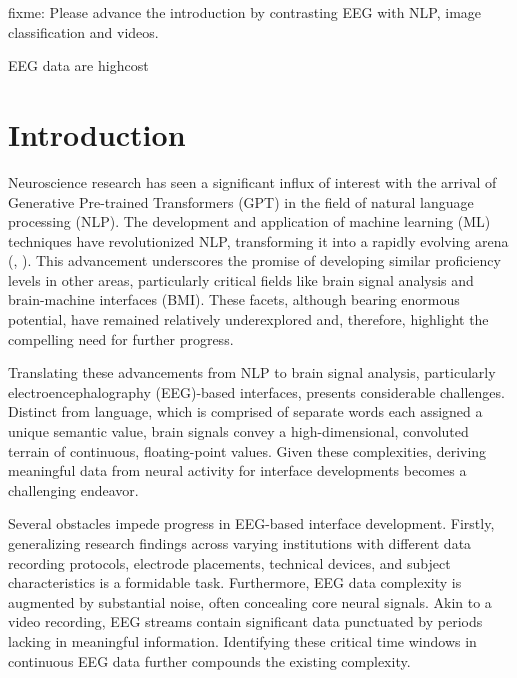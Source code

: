 fixme:
Please advance the introduction by contrasting EEG with NLP, image classification and videos.

EEG data are highcost


\section{Introduction}

Neuroscience research has seen a significant influx of interest with the arrival of Generative Pre-trained Transformers (GPT) in the field of natural language processing (NLP). The development and application of machine learning (ML) techniques have revolutionized NLP, transforming it into a rapidly evolving arena (\cite{NIPS2017_3f5ee243}, \cite{radford_language_nodate}). This advancement underscores the promise of developing similar proficiency levels in other areas, particularly critical fields like brain signal analysis and brain-machine interfaces (BMI). These facets, although bearing enormous potential, have remained relatively underexplored and, therefore, highlight the compelling need for further progress.

Translating these advancements from NLP to brain signal analysis, particularly electroencephalography (EEG)-based interfaces, presents considerable challenges. Distinct from language, which is comprised of separate words each assigned a unique semantic value, brain signals convey a high-dimensional, convoluted terrain of continuous, floating-point values. Given these complexities, deriving meaningful data from neural activity for interface developments becomes a challenging endeavor.

Several obstacles impede progress in EEG-based interface development. Firstly, generalizing research findings across varying institutions with different data recording protocols, electrode placements, technical devices, and subject characteristics is a formidable task. Furthermore, EEG data complexity is augmented by substantial noise, often concealing core neural signals. Akin to a video recording, EEG streams contain significant data punctuated by periods lacking in meaningful information. Identifying these critical time windows in continuous EEG data further compounds the existing complexity.

